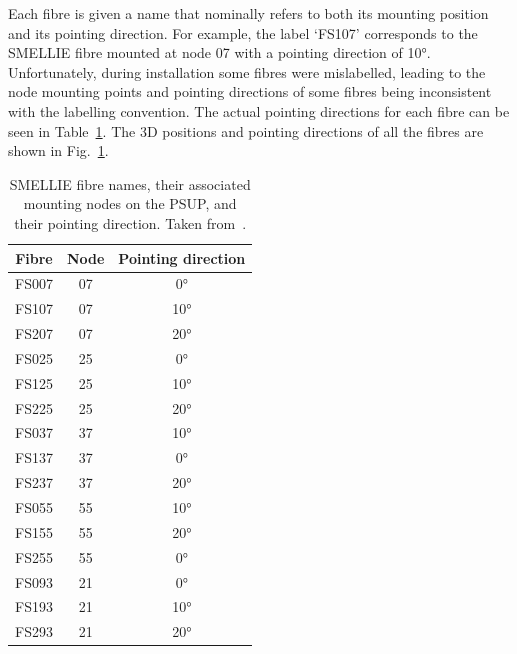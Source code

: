 Each fibre is given a name that nominally refers to both its mounting position and its pointing direction. For example, the label `FS107' corresponds to the SMELLIE fibre mounted at node 07 with a pointing direction of \ang{10}. Unfortunately, during installation some fibres were mislabelled, leading to the node mounting points and pointing directions of some fibres being inconsistent with the labelling convention. The actual pointing directions for each fibre can be seen in Table~\ref{tab:smellie_fibre_labellings}.
The 3D positions and pointing directions of all the fibres are shown in Fig.~\ref{fig:smellie_pos_dirs}.

\begin{table}
    \centering
    \begin{tabular}{c c c}
        \hline
        Fibre   & Node & Pointing direction \\ \hline \hline
        FS007   & 07   & \ang{0}  \\
        FS107   & 07   & \ang{10} \\
        FS207   & 07   & \ang{20} \\
        FS025   & 25   & \ang{0}  \\
        FS125   & 25   & \ang{10} \\
        FS225   & 25   & \ang{20} \\
        FS037   & 37   & \ang{10} \\
        FS137   & 37   & \ang{0}  \\
        FS237   & 37   & \ang{20} \\
        FS055   & 55   & \ang{10} \\
        FS155   & 55   & \ang{20} \\
        FS255   & 55   & \ang{0}  \\
        FS093   & 21   & \ang{0}  \\
        FS193   & 21   & \ang{10} \\
        FS293   & 21   & \ang{20} \\
        \hline
    \end{tabular}
    \caption[SMELLIE fibre names, their associated mounting nodes on the PSUP, and their pointing direction.]
    {SMELLIE fibre names, their associated mounting nodes on the PSUP, and their pointing direction. Taken from~\cite{turnerMeasurementScatteringCharacteristics2022}.}
    \label{tab:smellie_fibre_labellings}
\end{table}

\begin{figure}
    \centering
    \caption[]{}
    \label{fig:smellie_pos_dirs}
\end{figure}


